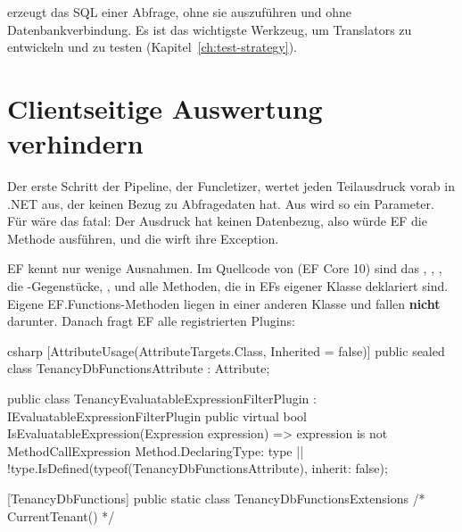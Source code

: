 \begin{tip}
   erzeugt
  das SQL einer Abfrage, ohne sie auszuführen und ohne Datenbankverbindung. Es ist das
  wichtigste Werkzeug, um Translators zu entwickeln und zu testen
  (Kapitel~\ref{ch:test-strategy}).
\end{tip}

\chapter{Clientseitige Auswertung verhindern}\label{ch:preventing-client-side-evaluation}

Der erste Schritt der Pipeline, der Funcletizer, wertet jeden Teilausdruck vorab in .NET
aus, der keinen Bezug zu Abfragedaten hat. Aus  wird
so ein Parameter. Für
 wäre
das fatal: Der Ausdruck hat keinen Datenbezug, also würde EF die Methode ausführen, und die
wirft ihre Exception.

EF kennt nur wenige Ausnahmen. Im Quellcode von
 (EF Core 10) sind das
,
,
, die
-Gegenstücke,
,
 und
alle Methoden, die in EFs eigener Klasse
 deklariert sind. Eigene
EF.Functions-Methoden liegen in einer anderen Klasse und fallen \textbf{nicht} darunter.
Danach fragt EF alle registrierten Plugins:

\begin{sourcecode}{csharp}
[AttributeUsage(AttributeTargets.Class, Inherited = false)]
public sealed class TenancyDbFunctionsAttribute : Attribute;

public class TenancyEvaluatableExpressionFilterPlugin : IEvaluatableExpressionFilterPlugin
{
    public virtual bool IsEvaluatableExpression(Expression expression)
        => expression is not MethodCallExpression { Method.DeclaringType: { } type }
           || !type.IsDefined(typeof(TenancyDbFunctionsAttribute), inherit: false);
}

[TenancyDbFunctions]
public static class TenancyDbFunctionsExtensions { /* CurrentTenant() */ }
\end{sourcecode}

